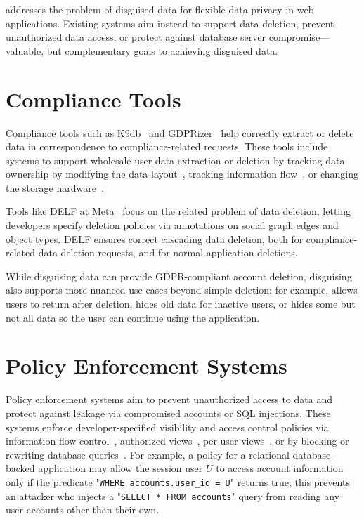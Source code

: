 
\sys addresses the problem of disguised data for flexible data privacy in web
applications.
%
Existing systems aim instead to support data deletion, prevent unauthorized data
access, or protect against database server compromise---valuable, but
complementary goals to achieving disguised data.%

\section{Compliance Tools}
Compliance tools such as K9db~\cite{k9db} and GDPRizer~\cite{gdprizer} help
correctly extract or delete data in correspondence to compliance-related
requests.
%
These tools include systems to support wholesale user data extraction or deletion by tracking data
ownership by modifying the data layout~\cite{usershards, k9db}, tracking
information flow~\cite{schengendb}, or changing the
storage hardware~\cite{sdp}.
%

%
Tools like DELF at Meta~\cite{delf} focus on the related problem of data
deletion, letting developers specify deletion policies via
annotations on social graph edges and object types. DELF ensures correct
cascading data deletion, both for compliance-related data deletion requests, and
for normal application deletions.
%

%
While disguising data can provide GDPR-compliant account deletion, disguising
also supports more nuanced use cases beyond simple deletion: for example, \sys
allows users to return after deletion, hides old data for inactive users, or
hides some but not all data so the user can continue using the application.
%

\section{Policy Enforcement Systems}
Policy enforcement systems 
aim to prevent unauthorized access to data and protect against leakage via
compromised accounts or SQL injections. 
%
These systems enforce developer-specified
visibility and access control policies via information flow
control~\cite{static, jeeves, jif, hails, ifdb}, authorized views~\cite{oracle},
per-user views~\cite{multiverse}, or by blocking or rewriting database
queries~\cite{blockaid, qapla, sieve}.
%
For example, a policy for a relational database-backed application may allow the
session user $U$ to access account information only if the predicate "\texttt{WHERE
accounts.user\_id = U}" returns true; this prevents an attacker who injects a
"\texttt{SELECT * FROM accounts}" query from reading any user accounts other than their
own.
%

